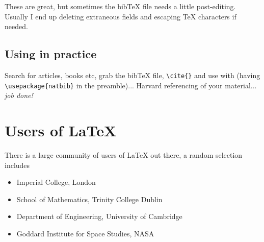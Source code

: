 \documentclass{tufte-handout}
\begin{document}
These are great, but sometimes the bibTeX file needs a little post-editing.
 Usually I end up deleting extraneous fields and escaping TeX characters if needed.

\subsection{Using in practice}
Search for articles, books etc, grab the bibTeX file, \verb`\cite{}` and use
 \verb`` with \verb``
 (having \verb`\usepackage{natbib}` in the preamble)...   
 Harvard referencing of your material... \emph{job done!}


\section{Users of LaTeX}
There is a large community of users of LaTeX out there, a random selection includes

\begin{itemize}
\item Imperial College, London
\item School of Mathematics, Trinity College Dublin
\item Department of Engineering, University of Cambridge
\item Goddard Institute for Space Studies, NASA
\end{itemize}



\nocite{*}
\end{document}
